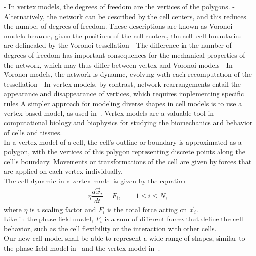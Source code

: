 - In vertex models, the degrees of freedom are the vertices of the polygons.
- Alternatively, the network can be described by the cell centers, and this reduces the number of degrees of freedom. These descriptions are known as Voronoi models because, given the positions of the cell centers, the cell–cell boundaries are delineated by the Voronoi tessellation
- The difference in the number of degrees of freedom has important consequences for the mechanical properties of the network, which may thus differ between vertex and Voronoi models 
- In Voronoi models, the network is dynamic, evolving with each recomputation of the tessellation
- In vertex models, by contrast, network rearrangements entail the appearance and disappearance of vertices, which requires implementing specific rules
A simpler approach for modeling diverse shapes in cell models is to use a vertex-based model, as used in~\cite{Fletcher14}. 
Vertex models are a valuable tool in computational biology and biophysics for studying the biomechanics and behavior of cells and tissues. \\
In a vertex model of a cell, the cell's outline or boundary is approximated as a polygon, with the vertices of this polygon representing discrete points along the cell's boundary. 
Movements or transformations of the cell are given by forces that are applied on each vertex individually. \\
The cell dynamic in a vertex model is given by the equation
\begin{align}
	\eta \dfrac{d \vec{x}_i}{dt} = F_i, \qquad 1 \leq i \leq N \label{eq:vertexmodel}, 
\end{align}
where $\eta$ is a scaling factor and $F_i$ is the total force acting on $\vec{x}_i$. \\
Like in the phase field model, $F_i$ is a sum of different forces that define the cell behavior, such as the cell flexibility or the interaction with other cells. \\
Our new cell model shall be able to represent a wide range of shapes, similar to the phase field model in~\cite{Happel2023} and the vertex model in~\cite{Fletcher14}. \\



